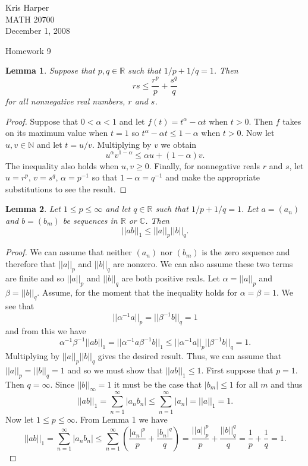 \documentclass{article}
\newtheorem{lemma}{Lemma}
\begin{document}
\begin{flushright}
Kris Harper\\

MATH 20700\\

December 1, 2008
\end{flushright}

\begin{center}
Homework 9
\end{center}

\begin{flushleft}

\begin{lemma}
Suppose that $p,q \in \mathbb{R}$ such that $1/p + 1/q = 1$. Then
\[
rs \leq \frac{r^p}{p} + \frac{s^q}{q}
\]
for all nonnegative real numbers, $r$ and $s$.
\end{lemma}
\begin{proof}
Suppose that $0 < \alpha < 1$ and let $f(t) = t^{\alpha} - \alpha t$ when $t > 0$. Then $f$ takes on its maximum value when $t=1$ so $t^{\alpha} - \alpha t \leq 1 - \alpha$ when $t > 0$. Now let $u,v \in \mathbb{N}$ and let $t = u/v$. Multiplying by $v$ we obtain
\[
u^{\alpha} v^{1 - \alpha} \leq \alpha u + (1 - \alpha) v.
\]
The inequality also holds when $u,v \geq 0$. Finally, for nonnegative reals $r$ and $s$, let $u = r^p$, $v = s^q$, $\alpha = p^{-1}$ so that $1 - \alpha = q^{-1}$ and make the appropriate substitutions to see the result.
\end{proof}

\begin{lemma}
Let $1 \leq p \leq \infty$ and let $q \in \mathbb{R}$ such that $1/p + 1/q = 1$. Let $a = (a_n)$ and $b = (b_m)$ be sequences in $\mathbb{R}$ or $\mathbb{C}$. Then
\[
||a b||_1 \leq ||a||_p ||b||_q.
\]
\end{lemma}
\begin{proof}
We can assume that neither $(a_n)$ nor $(b_m)$ is the zero sequence and therefore that $||a||_p$ and $||b||_q$ are nonzero. We can also assume these two terms are finite and so $||a||_p$ and $||b||_q$ are both positive reals. Let $\alpha = ||a||_p$ and $\beta = ||b||_q$. Assume, for the moment that the inequality holds for $\alpha = \beta = 1$. We see that
\[
||\alpha^{-1} a||_p = ||\beta^{-1} b||_q = 1
\]
and from this we have
\[
\alpha^{-1} \beta^{-1} ||a b||_1 = ||\alpha^{-1} a \beta^{-1} b||_1 \leq ||\alpha^{-1} a||_p ||\beta^{-1} b||_q = 1.
\]
Multiplying by $||a||_p ||b||_q$ gives the desired result. Thus, we can assume that $||a||_p = ||b||_q = 1$ and so we must show that $||a b||_1 \leq 1$. First suppose that $p = 1$. Then $q = \infty$. Since $||b||_{\infty} = 1$ it must be the case that $|b_m| \leq 1$ for all $m$ and thus
\[
||ab||_1 = \sum_{n=1}^{\infty} |a_nb_n| \leq \sum_{n=1}^{\infty} |a_n| = ||a||_1 = 1.
\]
Now let $1 \leq p \leq \infty$. From Lemma 1 we have
\[
||ab||_1 = \sum_{n=1}^{\infty} |a_n b_n| \leq \sum_{n=1}^{\infty} \left ( \frac{|a_n|^p}{p} + \frac{|b_n|^q}{q} \right ) = \frac{||a||_p^p}{p} + \frac{||b||_q^q}{q} = \frac{1}{p} + \frac{1}{q} = 1.
\]
\end{proof}


\end{flushleft}
\end{document}
